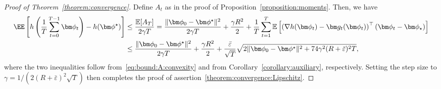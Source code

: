 \documentclass[11pt, a4paper, oneside, reqno]{article}
\begin{document}
	\begin{proof} [Proof of Theorem~\ref{theorem:convergence}]
	    Define $A_t$ as in the proof of Proposition~\ref{proposition:moments}. Then, we have
	    \begin{align}
	        \EE \left[ h \left(\frac{1}{T} \sum_{t=0}^{T-1} \bm \phi_{t} \right) - h(\bm \phi^\star) \right]
	        &\leq \frac{\mathbb E[A_T]}{2 \gamma T}
	        = \frac{\| \bm \phi_0 - \bm \phi^\star \|^2}{2 \gamma T} + \frac{\gamma R^2}{2} + \frac{1}{T} \sum_{t=1}^T \mathbb E \left[ \left( \nabla h(\bm \phi_{t}) - \bm g_t(\bm \phi_{t}) \right)^\top (\bm \phi_{t} - \bm \phi_{\star}) \right] \notag \\
	        &\leq \frac{\| \bm \phi_0 - \bm \phi^\star \|^2}{2 \gamma T} + \frac{\gamma R^2}{2} + \frac{\bar \varepsilon}{\sqrt{T}} \sqrt{2 \| \bm \phi_0 - \bm \phi^\star \|^2 + 74 \gamma^2 (R + \bar \varepsilon)^2 T}, \label{eq:main:convergence}
	    \end{align}
	    where the two inequalities follow from~\eqref{eq:bound:A:convexity} and from Corollary~\ref{corollary:auxiliary}, respectively.
		Setting the step size to $\gamma = 1 / ( 2 (R+ \bar \varepsilon)^2 \sqrt{T} )$ then completes the proof of assertion~\ref{theorem:convergence:Lipschitz}.
		

\end{proof}
\end{document}
